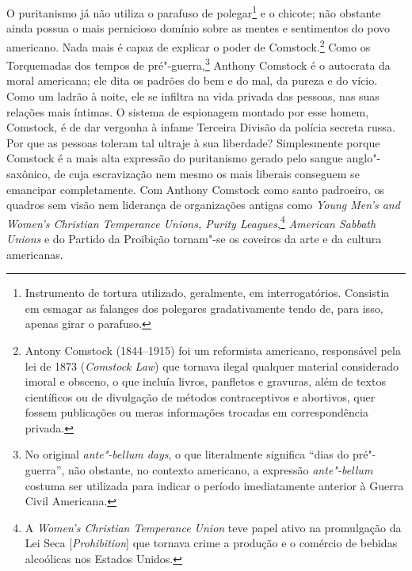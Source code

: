O puritanismo já não utiliza o parafuso de polegar\footnote{Instrumento
  de tortura utilizado, geralmente, em interrogatórios. Consistia em
  esmagar as falanges dos polegares gradativamente tendo de, para isso,
  apenas girar o parafuso.} e o chicote; não obstante ainda possua o
mais pernicioso domínio sobre as mentes e sentimentos do povo americano.
Nada mais é capaz de explicar o poder de Comstock.\footnote{Antony
  Comstock (1844--1915) foi um reformista americano, responsável pela lei
  de 1873 (\emph{Comstock Law}) que tornava ilegal qualquer material
  considerado imoral e obsceno, o que incluía livros, panfletos e gravuras,
  além de textos científicos ou de divulgação de métodos contraceptivos
  e abortivos, quer fossem publicações ou meras informações trocadas em
  correspondência privada.} Como os Torquemadas dos tempos de
pré"-guerra,\footnote{No original \emph{ante"-bellum days}, o que
  literalmente significa ``dias do pré"-guerra'', não obstante, no
  contexto americano, a expressão \emph{ante"-bellum} costuma ser
  utilizada para indicar o período imediatamente anterior à Guerra Civil
  Americana.} Anthony Comstock é o autocrata da moral americana; ele
dita os padrões do bem e do mal, da pureza e do vício. Como um ladrão à
noite, ele se infiltra na vida privada das pessoas, nas suas relações
mais íntimas. O sistema de espionagem montado por esse homem, Comstock,
é de dar vergonha à infame Terceira Divisão da polícia secreta russa.
Por que as pessoas toleram tal ultraje à sua liberdade? Simplesmente
porque Comstock é a mais alta expressão do puritanismo gerado pelo
sangue anglo"-saxônico, de cuja escravização nem mesmo os mais liberais
conseguem se emancipar completamente. Com Anthony Comstock como santo
padroeiro, os quadros sem visão nem liderança de organizações antigas %
como \emph{Young Men's and Women's Christian Temperance Unions, Purity %
Leagues},\footnote{A \emph{Women's Christian Temperance Union} teve papel
  ativo na promulgação da Lei Seca {[}\emph{Prohibition}{]} que tornava
  crime a produção e o comércio de bebidas alcoólicas nos Estados
  Unidos.} \emph{American Sabbath Unions} e do Partido da Proibição tornam"-se
os coveiros da arte e da cultura americanas.

